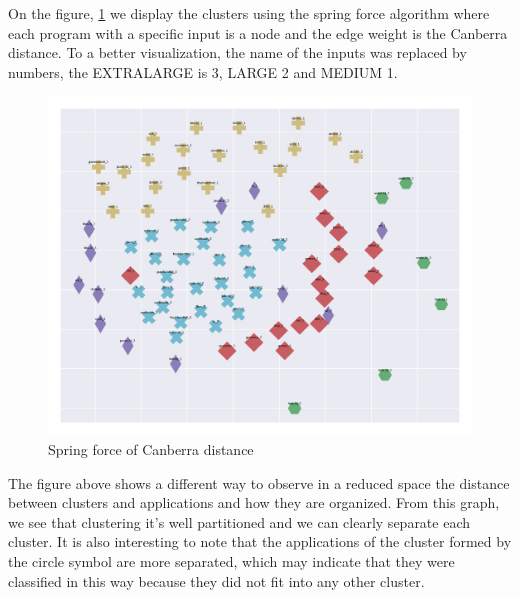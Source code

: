 On the figure, \ref{fig:sping_force_is} we display the clusters using the spring force algorithm where each program with a specific input is a node and the edge weight is the Canberra distance. To a better visualization, the name of the inputs was replaced by numbers, the EXTRALARGE is 3, LARGE 2 and MEDIUM 1. 

\begin{figure}[H]
	\centering
	\includegraphics[width=\textwidth]{fingerprint/figures/graph_input_size.png}
	\caption{Spring force of Canberra distance}
	\label{fig:sping_force_is}
\end{figure}

The figure above shows a different way to observe in a reduced space the distance between clusters and applications and how they are organized. From this graph, we see that clustering it's well partitioned and we can clearly separate each cluster. It is also interesting to note that the applications of the cluster formed by the circle symbol are more separated, which may indicate that they were classified in this way because they did not fit into any other cluster.


